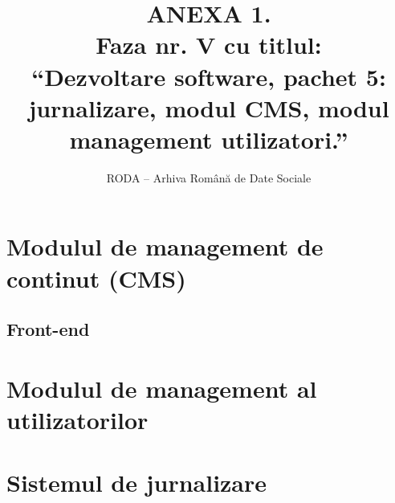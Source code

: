 \documentclass[11pt,twoside,romanian]{extbook}
\begin{document}
\fancyhead[RE,LO]{\thepage}


\title{ANEXA 1.\\
Faza nr. V 
cu titlul:\\
``Dezvoltare software, pachet 5: jurnalizare, modul CMS, modul management utilizatori.''
}

\author{RODA -- Arhiva Rom\^{a}n\u{a} de Date Sociale}

\date{ }

\maketitle

\newpage
\thispagestyle{plain}
\tableofcontents{}
\setcounter{page}{1}

\chapter{Modulul de management de continut (CMS)}

\section{Front-end}











 



\chapter{Modulul de management al utilizatorilor}


\chapter{Sistemul de jurnalizare}




\end{document}
